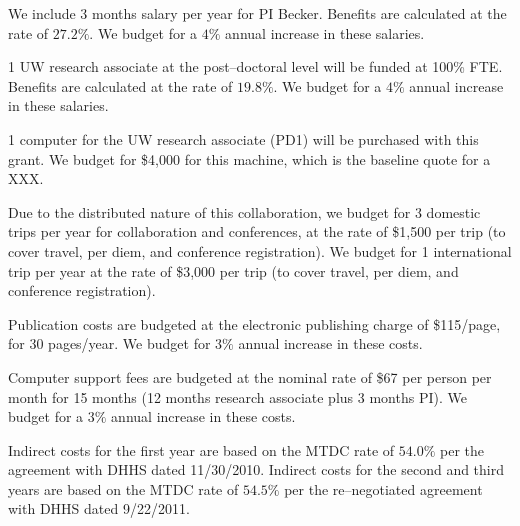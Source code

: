 \bigskip {} We include 3 months salary per year for PI
Becker. Benefits are calculated at the rate of $27.2\%$.  We budget for a $4\%$
annual increase in these salaries.

\bigskip {} 1 UW research associate at the
post--doctoral level will be funded at 100\% FTE.  Benefits are calculated at
the rate of $19.8\%$.  We budget for a $4\%$ annual increase in these salaries.

\bigskip {} 1 computer for the UW research associate
(PD1) will be purchased with this grant. We budget for \$4,000 for this machine,
which is the baseline quote for a XXX.

\bigskip {} Due to the distributed nature of this
collaboration, we budget for 3 domestic trips per year for collaboration and
conferences, at the rate of \$1,500 per trip (to cover travel, per diem, and
conference registration).  We budget for 1 international trip per year at the
rate of \$3,000 per trip (to cover travel, per diem, and conference
registration).

\bigskip {} Publication costs are budgeted at
the electronic publishing charge of \$115/page, for 30 pages/year.  We budget
for $3\%$ annual increase in these costs.

\bigskip {} Computer support fees are budgeted at
the nominal rate of \$67 per person per month for 15 months (12 months research
associate plus 3 months PI).  We budget for a $3\%$ annual increase in these
costs.

\bigskip {} Indirect costs for the first year are based on
the MTDC rate of $54.0\%$ per the agreement with DHHS dated 11/30/2010. Indirect
costs for the second and third years are based on the MTDC rate of $54.5\%$ per
the re--negotiated agreement with DHHS dated 9/22/2011.
